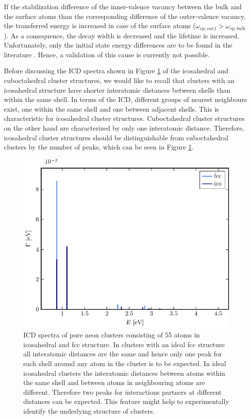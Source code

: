 If the stabilization difference of the inner-valence vacancy between the bulk
and the surface atoms than the corresponding difference of the outer-valence
vacancy, the transferred energy is increased in case of the surface atoms
($\omega_{vp,surf} > \omega_{vp,bulk}$). As a consequence, the decay width
is decreased and the lifetime is increased. Unfortunately, only the initial
state energy differences are to be found in the literature \cite{Ohrwall04}.
Hence, a validation of this cause is currently not possible.


Before discussing the ICD spectra shown in Figure \ref{figure:reinNe} of
the icosahedral and cuboctahedral cluster
structures, we would like to recall that clusters with an icosahedral structure
have shorter interatomic distances between shells than within the same
shell.
In terms of the ICD, different groups of nearest neighbours exist,
one within the same shell and one
between adjacent shells. This is characteristic for icosahedral cluster
structures. Cuboctahedral cluster structures on the other hand are characterized
by only one interatomic distance. 
Therefore, icosahedral cluster structures should be distinguishable from
cuboctahedral clusters by the number of peaks, which can be seen in Figure
\ref{figure:reinNe}.

\begin{figure}[h]
 \centering
 \includegraphics[width=\columnwidth]{pics/reinNe}
 \caption{ICD spectra of pure neon clusters consisting of 55 atoms in
          icosahedral and fcc structure. In clusters with an ideal fcc structure
          all interatomic distances are the same and hence only one peak
          for each shell around any atom in the cluster is to be expected.
          In ideal icosahedral clusters the interatomic distances between atoms
          within the same shell and between atoms in neighbouring atoms
          are different. Therefore two peaks for interactions partners
          at different distances can be expected. This feature might
          help to experimentally identify the underlying structure of clusters.}
 \label{figure:reinNe}
\end{figure}

